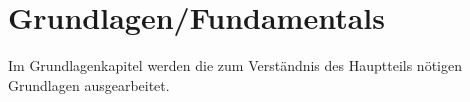 \chapter{Grundlagen/Fundamentals}
Im Grundlagenkapitel werden die zum Verständnis des Hauptteils nötigen Grundlagen ausgearbeitet.  
